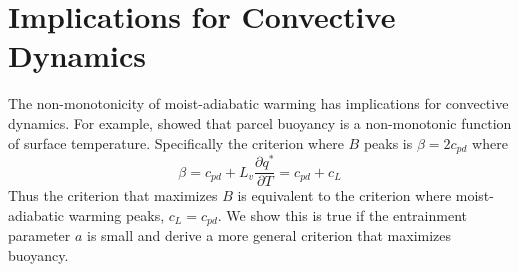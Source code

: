 \documentclass[draft]{ametsocV6.1}
\begin{document}
\section{Implications for Convective Dynamics}
The non-monotonicity of moist-adiabatic warming has implications for convective dynamics. For example, \cite{romps2016} showed that parcel buoyancy is a non-monotonic function of surface temperature. Specifically the criterion where $B$ peaks is $\beta = 2c_{pd}$ where
\begin{equation}
\beta = c_{pd} + L_v\frac{\partial q^*}{\partial T} = c_{pd} + c_L
\end{equation}
Thus the \cite{romps2016} criterion that maximizes $B$ is equivalent to the criterion where moist-adiabatic warming peaks, $c_L = c_{pd}$. We show this is true if the entrainment parameter $a$ is small and derive a more general criterion that maximizes buoyancy. 
\end{document}
